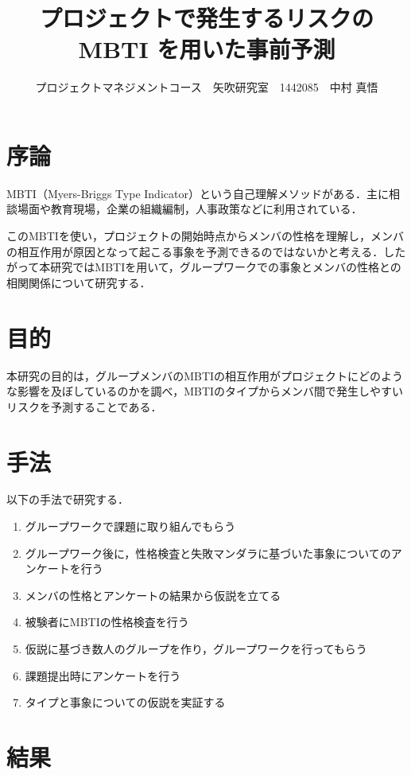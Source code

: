\documentclass[uplatex,twocolumn,dvipdfmx]{jsarticle}
\title{\vspace{-5mm}\fontsize{14pt}{0pt}\selectfont プロジェクトで発生するリスクのMBTI を用いた事前予測}
\author{\normalsize プロジェクトマネジメントコース　矢吹研究室　1442085　中村 真悟}
\date{}
\begin{document}
\fontsize{10.5pt}{\baselineskip}\selectfont
\maketitle





\section{序論}\label{序論}
MBTI（Myers-Briggs Type Indicator）という自己理解メソッドがある．主に相談場面や教育現場，企業の組織編制，人事政策などに利用されている\cite{110001230195}．

このMBTIを使い，プロジェクトの開始時点からメンバの性格を理解し，メンバの相互作用が原因となって起こる事象を予測できるのではないかと考える．したがって本研究ではMBTIを用いて，グループワークでの事象とメンバの性格との相関関係について研究する．

\section{目的}

本研究の目的は，グループメンバのMBTIの相互作用がプロジェクトにどのような影響を及ぼしているのかを調べ，MBTIのタイプからメンバ間で発生しやすいリスクを予測することである．
\section{手法}

以下の手法で研究する．
\begin{enumerate}
\item グループワークで課題に取り組んでもらう
\item グループワーク後に，性格検査\cite{MBTI}と失敗マンダラ\cite{110009915588}に基づいた事象についてのアンケートを行う
\item メンバの性格とアンケートの結果から仮説を立てる
\item 被験者にMBTIの性格検査を行う
\item 仮説に基づき数人のグループを作り，グループワークを行ってもらう
\item 課題提出時にアンケートを行う
\item タイプと事象についての仮説を実証する
\end{enumerate}
\section{結果}　
\end{document}
